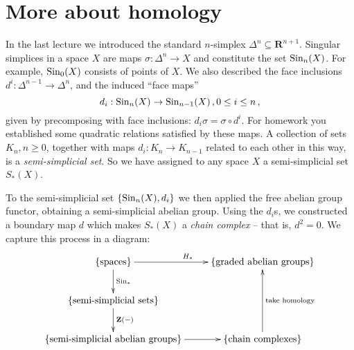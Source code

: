 
\section{More about homology}
In the last lecture we introduced the standard $n$-simplex $\Delta^n\subseteq\mathbf{R}^{n+1}$. Singular simplices in a space $X$ are maps $\sigma\colon\Delta^n\to X$ and constitute the set $\mathrm{Sin}_n(X)$. For example, $\mathrm{Sin}_0(X)$ consists of points of $X$. We also described the face inclusions $d^i:\Delta^{n-1}\to\Delta^n$, and the induced ``face maps'' 
\[
d_i:\mathrm{Sin}_n(X)\to\mathrm{Sin}_{n-1}(X)\,,0\leq i\leq n\,,
\]
given by precomposing with face inclusions: $d_i\sigma=\sigma\circ d^i$. 
For homework you established some quadratic relations satisfied by these maps.
A collection of sets $K_n,n\geq0$, together with maps $d_i:K_n\to K_{n-1}$
related to each other in this way, is a {\em semi-simplicial set}. 
So we have assigned to any space $X$ a semi-simplicial set $S_*(X)$. 

To the semi-simplicial set $\{\mathrm{Sin}_n(X),d_i\}$ we then applied the free abelian group functor, obtaining a semi-simplicial abelian group. Using the $d_i$s, we constructed a boundary map $d$ which makes $S_\ast(X)$ a \emph{chain complex} -- that is, $d^2=0$. We capture this process in a diagram:
\begin{equation*}
\xymatrix{
\{\text{spaces}\}\ar[d]^{\Sin_*}\ar[r]^{H_*} & 
\{\text{graded abelian groups}\} \\
\{\text{semi-simplicial sets}\}\ar[d]^{\mathbf{Z}(-)} \\ 
\{\text{semi-simplicial abelian groups}\}\ar[r] & 
\{\text{chain complexes}\}\ar[uu]_{\text{take homology}}\\
}\end{equation*}

